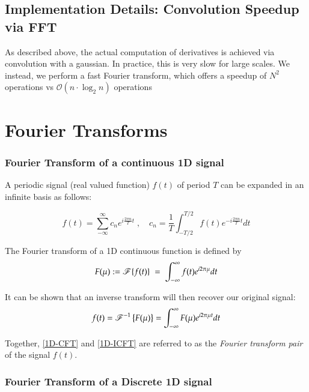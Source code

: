         
	\subsection{Implementation Details: Convolution Speedup via FFT}
	
	As described above, the actual computation of derivatives is achieved via convolution with a gaussian. In practice, this is very slow for large scales. We instead, we perform a fast Fourier transform, which offers a speedup of $N^2$ operations vs $\mathscr{O}\left(n\cdot \log_2n\right)$ operations 

\section{Fourier Transforms}
	\subsubsection{Fourier Transform of a continuous 1D signal}
	
	
	A periodic signal (real valued function) $f(t)$ of period $T$ can  be expanded in an infinite basis as follows:
	
	\begin{equation}
		f(t) = \sum_{-\infty}^{\infty} c_n e^{i\frac{2\pi n}{T}t} \;,\quad
			c_n = \frac{1}{T}\int_{-T/2}^{T/2} f(t) e^{-i\frac{2\pi n}{T}t} dt
			\end{equation}
	
	The Fourier transform of a 1D continuous function is defined by
	\begin{equation} \label{1D-CFT}
		F(\mu) := \operatorname{\mathscr{F}}\{f(t)\} \;=\; \int_{-\infty}^{\infty} f(t) e^{i2\pi \mu } dt
	\end{equation}
	
	It can be shown  that an inverse transform will then recover our original signal:
	\begin{equation} \label{1D-ICFT}
		f(t) = \operatorname{\mathscr{F}}^{-1}\left\{F(\mu)\right\} = \int_{-\infty}^{\infty} F(\mu) e^{i2\pi \mu t} dt
	\end{equation}
	
	Together, \cref{1D-CFT} and \cref{1D-ICFT} are referred to as the \textit{Fourier transform pair} of the signal $f(t)$. 
	
	\subsubsection{Fourier Transform of a Discrete 1D signal}
	
